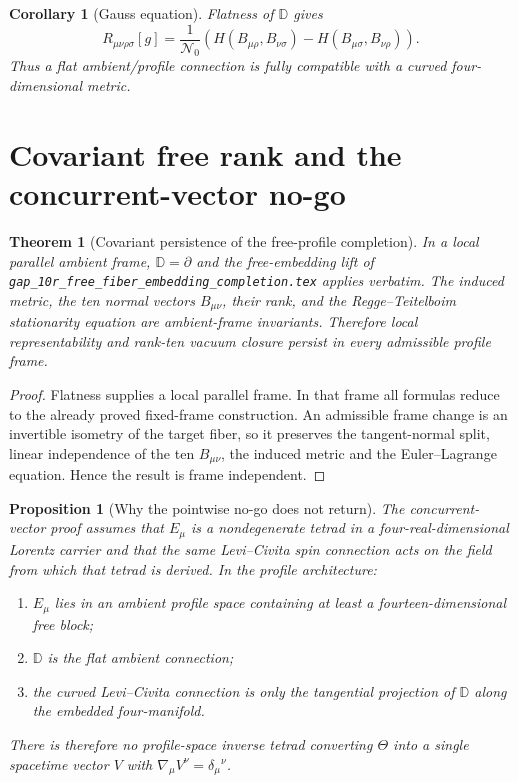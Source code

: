 \documentclass[11pt,a4paper]{article}
\newtheorem{theorem}[definition]{Theorem}
\newtheorem{proposition}[definition]{Proposition}
\newtheorem{corollary}[definition]{Corollary}
\theoremstyle{remark}
\newcommand{\Nzero}{\mathcal N_0}
\newcommand{\Db}{\mathbb D}
\begin{document}
\begin{corollary}[Gauss equation]
Flatness of $\Db$ gives
\begin{equation}
 R_{\mu\nu\rho\sigma}[g]
 =\frac1{\Nzero}\left(
 H(B_{\mu\rho},B_{\nu\sigma})
 -H(B_{\mu\sigma},B_{\nu\rho})\right).
 \label{eq:Gauss}
\end{equation}
Thus a flat ambient/profile connection is fully compatible with a curved
four-dimensional metric.
\end{corollary}

\section{Covariant free rank and the concurrent-vector no-go}

\begin{theorem}[Covariant persistence of the free-profile completion]
In a local parallel ambient frame, $\Db=\partial$ and the free-embedding lift
of \texttt{gap\_10r\_free\_fiber\_embedding\_completion.tex} applies
verbatim.  The induced metric, the ten normal vectors $B_{\mu\nu}$, their rank,
and the Regge--Teitelboim stationarity equation are ambient-frame invariants.
Therefore local representability and rank-ten vacuum closure persist in every
admissible profile frame.
\end{theorem}

\begin{proof}
Flatness supplies a local parallel frame.  In that frame all formulas reduce
to the already proved fixed-frame construction.  An admissible frame change is
an invertible isometry of the target fiber, so it preserves the tangent-normal
split, linear independence of the ten $B_{\mu\nu}$, the induced metric and the
Euler--Lagrange equation.  Hence the result is frame independent.
\end{proof}

\begin{proposition}[Why the pointwise no-go does not return]
The concurrent-vector proof assumes that $E_\mu$ is a nondegenerate tetrad in
a four-real-dimensional Lorentz carrier and that the same Levi--Civita spin
connection acts on the field from which that tetrad is derived.  In the
profile architecture:
\begin{enumerate}
 \item $E_\mu$ lies in an ambient profile space containing at least a
       fourteen-dimensional free block;
 \item $\Db$ is the flat ambient connection;
 \item the curved Levi--Civita connection is only the tangential projection of
       $\Db$ along the embedded four-manifold.
\end{enumerate}
There is therefore no profile-space inverse tetrad converting $\Theta$ into a
single spacetime vector $V$ with $\nabla_\mu V^\nu=\delta_\mu{}^\nu$.
\end{proposition}
\end{document}
